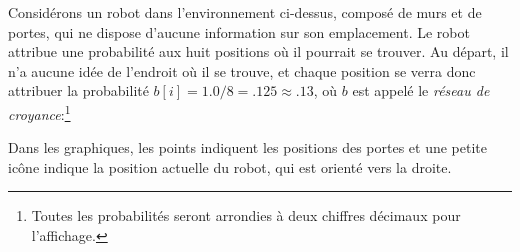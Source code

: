 Considérons un robot dans l'environnement ci-dessus, composé de murs et de portes, qui ne dispose d'aucune information sur son emplacement. Le robot attribue une probabilité aux huit positions où il pourrait se trouver. Au départ, il n'a aucune idée de l'endroit où il se trouve, et chaque position se verra donc attribuer la probabilité $b[i]=1.0/8=.125\approx .13$, où $b$ est appelé le \emph{réseau de croyance}:\footnote{Toutes les probabilités seront arrondies à deux chiffres décimaux pour l'affichage.}
\begin{center}
\end{center}
Dans les graphiques, les points indiquent les positions des portes et une petite icône indique la position actuelle du robot, qui est orienté vers la droite.

